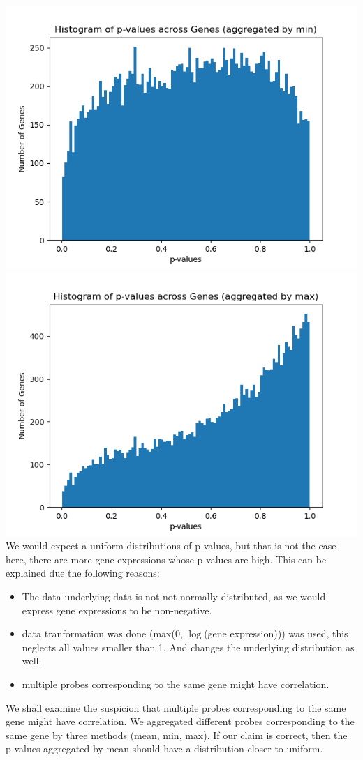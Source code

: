 \documentclass{article}
\begin{document}
\includegraphics{Plot3.png}\\
\includegraphics{Plot4.png}\\
We would expect a uniform distributions of p-values, but that is not the case here, there are more gene-expressions whose p-values are high. This can be explained due the following reasons:
\begin{itemize}
    \item The data underlying data is not not normally distributed, as we would express gene expressions to be non-negative.
    \item data tranformation was done (max(0, $\log$(gene expression))) was used, this neglects all values smaller than 1. And changes the underlying distribution as well.
    \item multiple probes corresponding to the same gene might have correlation.
\end{itemize}
We shall examine the suspicion that multiple probes corresponding to the same gene might have correlation. We aggregated different probes corresponding to the same gene by three methods (mean, min, max). If our claim is correct, then the p-values aggregated by mean should have a distribution closer to uniform.
\end{document}
